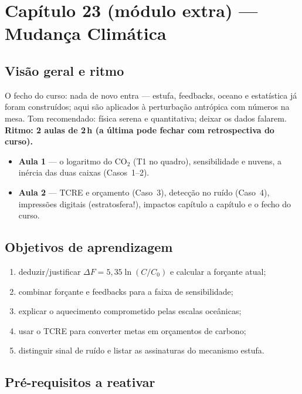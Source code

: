 ﻿%
\section{Capítulo 23 (módulo extra) --- Mudança Climática}

\subsection*{Visão geral e ritmo}

O fecho do curso: nada de novo entra — estufa, feedbacks, oceano e
estatística já foram construídos; aqui são aplicados à perturbação
antrópica com números na mesa. Tom recomendado: física serena e
quantitativa; deixar os dados falarem. \textbf{Ritmo: 2 aulas de 2\,h
(a última pode fechar com retrospectiva do curso).}

\begin{itemize}
  \item \textbf{Aula 1} — o logaritmo do CO$_2$ (T1 no quadro),
        sensibilidade e nuvens, a inércia das duas caixas (Casos~1--2).
  \item \textbf{Aula 2} — TCRE e orçamento (Caso~3), detecção no
        ruído (Caso~4), impressões digitais (estratosfera!), impactos
        capítulo a capítulo e o fecho do curso.
\end{itemize}

\subsection*{Objetivos de aprendizagem}

\begin{enumerate}
  \item deduzir/justificar $\Delta F = 5{,}35\ln(C/C_0)$ e calcular a
        forçante atual;
  \item combinar forçante e feedbacks para a faixa de sensibilidade;
  \item explicar o aquecimento comprometido pelas escalas oceânicas;
  \item usar o TCRE para converter metas em orçamentos de carbono;
  \item distinguir sinal de ruído e listar as assinaturas do
        mecanismo estufa.
\end{enumerate}

\subsection*{Pré-requisitos a reativar}

